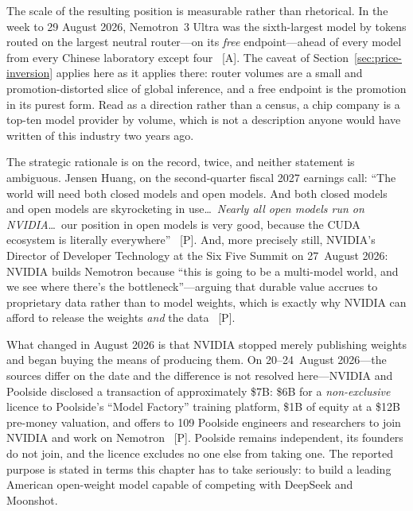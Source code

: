 The scale of the resulting position is measurable rather than rhetorical. In the week to 29 August 2026, Nemotron~3 Ultra was the sixth-largest model by tokens routed on the largest neutral router---on its \emph{free} endpoint---ahead of every model from every Chinese laboratory except four~\cite{openrouter-aug26} [A]. The caveat of Section~\ref{sec:price-inversion} applies here as it applies there: router volumes are a small and promotion-distorted slice of global inference, and a free endpoint is the promotion in its purest form. Read as a direction rather than a census, a chip company is a top-ten model provider by volume, which is not a description anyone would have written of this industry two years ago.

The strategic rationale is on the record, twice, and neither statement is ambiguous. Jensen Huang, on the second-quarter fiscal 2027 earnings call: ``The world will need both closed models and open models. And both closed models and open models are skyrocketing in use\ldots\ \emph{Nearly all open models run on NVIDIA}\ldots\ our position in open models is very good, because the CUDA ecosystem is literally everywhere''~\cite{nvda-open-models} [P]. And, more precisely still, NVIDIA's Director of Developer Technology at the Six Five Summit on 27~August 2026: NVIDIA builds Nemotron because ``this is going to be a multi-model world, and we see where there's the bottleneck''---arguing that durable value accrues to proprietary data rather than to model weights, which is exactly why NVIDIA can afford to release the weights \emph{and} the data~\cite{nvda-open-models} [P].

What changed in August 2026 is that NVIDIA stopped merely publishing weights and began buying the means of producing them. On 20--24~August 2026---the sources differ on the date and the difference is not resolved here---NVIDIA and Poolside disclosed a transaction of approximately \$7B: \$6B for a \emph{non-exclusive} licence to Poolside's ``Model Factory'' training platform, \$1B of equity at a \$12B pre-money valuation, and offers to 109 Poolside engineers and researchers to join NVIDIA and work on Nemotron~\cite{nvda-poolside} [P]. Poolside remains independent, its founders do not join, and the licence excludes no one else from taking one. The reported purpose is stated in terms this chapter has to take seriously: to build a leading American open-weight model capable of competing with DeepSeek and Moonshot.

